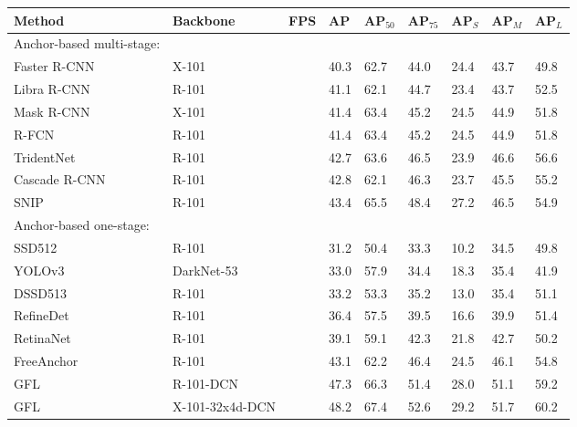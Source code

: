 \begin{table*}[tpb]
    \begin{center}
        \begin{tabular}{ K{11.0em} | K{8.0em} |K{2.5em} | K{4.2em} K{4.2em} K{4.2em} | K{4.2em} K{4.2em} K{4.2em} } 
            \hline
             Method  & Backbone & FPS & AP &  AP$_{50}$ &  AP$_{75}$ & AP$_{S}$ & AP$_{M}$ & AP$_{L}$ \\
            \hline
             Anchor-based multi-stage: &    &  & &  &  &  &\\ 
             Faster R-CNN~\cite{fasterRCNN} & X-101 & & 40.3 & 62.7 & 44.0 & 24.4 & 43.7 & 49.8  \\
             Libra R-CNN~\cite{libraRCNN} & R-101 & & 41.1 & 62.1 & 44.7 & 23.4 & 43.7 & 52.5  \\
             Mask R-CNN~\cite{maskRCNN} & X-101 &  & 41.4 & 63.4 & 45.2 & 24.5 & 44.9 & 51.8  \\
             R-FCN~\cite{RFCN} & R-101 &  & 41.4 & 63.4 & 45.2 & 24.5 & 44.9 & 51.8  \\
             TridentNet~\cite{TridentNet} & R-101  &  & 42.7 & 63.6 & 46.5 & 23.9 & 46.6 & 56.6  \\
             Cascade R-CNN~\cite{cascadeRCNN} & R-101 &  & 42.8 & 62.1 & 46.3 & 23.7 & 45.5 & 55.2  \\
             SNIP~\cite{SNIP} & R-101 &  & 43.4 & 65.5 & 48.4 & 27.2 & 46.5 & 54.9  \\
             
             
             \hline
             Anchor-based one-stage: &    &  &  &  &  &\\
             SSD512~\cite{SSD} & R-101 &  & 31.2 & 50.4 & 33.3 & 10.2 & 34.5 & 49.8 \\
             YOLOv3~\cite{YOLOv3} & DarkNet-53 &  & 33.0 & 57.9 & 34.4 & 18.3 & 35.4 & 41.9  \\
             DSSD513~\cite{DSSD} & R-101 &  & 33.2 & 53.3 & 35.2 & 13.0 & 35.4 & 51.1 \\
             RefineDet~\cite{refineDet} & R-101 &  & 36.4 & 57.5 & 39.5 & 16.6 & 39.9 & 51.4 \\
             RetinaNet~\cite{retinaNet} & R-101 &  & 39.1 & 59.1 & 42.3 & 21.8 & 42.7 & 50.2 \\
             FreeAnchor~\cite{freeAnchor} & R-101 &  & 43.1 & 62.2 & 46.4 & 24.5 & 46.1 & 54.8 \\
             GFL~\cite{GFL} & R-101-DCN &  & 47.3 & 66.3 & 51.4 & 28.0 & 51.1 & 59.2  \\
             GFL~\cite{GFL} & X-101-32x4d-DCN &  & 48.2 & 67.4 & 52.6 & 29.2 & 51.7 & 60.2  \\
             

\end{tabular}
\end{center}
\end{table*}
